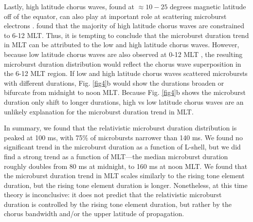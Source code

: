 \documentclass[draft]{agujournal2019}
\begin{document}
Lastly, high latitude chorus waves, found at $\approx 10-25$ degrees magnetic latitude off of the equator, can also play at important role at scattering microburst electrons \cite{Lorentzen2001a}.  found that the majority of high latitude chorus waves are constrained to 6-12 MLT. Thus, it is tempting to conclude that the microburst duration trend in MLT can be attributed to the low and high latitude chorus waves. However, because low latitude chorus waves are also observed at 0-12 MLT \cite{Li2009a}, the resulting microburst duration distribution would reflect the chorus wave superposition in the 6-12 MLT region. If low and high latitude chorus waves scattered microbursts with different durations, Fig. \ref{fig4}b would show the durations broaden or bifurcate from midnight to noon MLT. Because Fig. \ref{fig4}b shows the microburst duration only shift to longer durations, high vs low latitude chorus waves are an unlikely explanation for the microburst duration trend in MLT.

In summary, we found that the relativistic microburst duration distribution is peaked at 100 ms, with 75\% of microbursts narrower than 140 ms. We found no significant trend in the microburst duration as a function of L-shell, but we did find a strong trend as a function of MLT---the median microburst duration roughly doubles from 80 ms at midnight, to 160 ms at noon MLT. We found that the microburst duration trend in MLT scales similarly to the rising tone element duration, but the rising tone element duration is longer. Nonetheless, at this time theory is inconclusive: it does not predict that the relativistic microburst duration is controlled by the rising tone element duration, but rather by the chorus bandwidth and/or the upper latitude of propagation.

%
%
%
%
\end{document}
